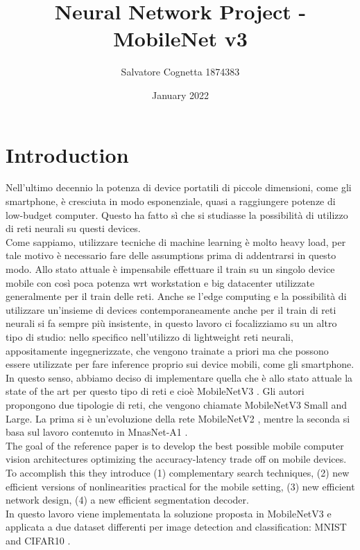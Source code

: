 \documentclass[12pt, letterpaper, twoside]{article}
\title{Neural Network Project - MobileNet v3}
\author{Salvatore Cognetta 1874383}
\date{January 2022}
\begin{document}
\begin{titlepage}
\maketitle
\end{titlepage}

\clearpage
\thispagestyle{empty}
\vspace*{\fill}
\vspace*{\fill}
\clearpage


\tableofcontents

\newpage
    
\newpage
\section{Introduction}
Nell'ultimo decennio la potenza di device portatili di piccole dimensioni, come gli smartphone, è cresciuta in modo esponenziale, quasi a raggiungere potenze di low-budget computer. Questo ha fatto sì che si studiasse la possibilità di utilizzo di reti neurali su questi devices. \\
Come sappiamo, utilizzare tecniche di machine learning è molto heavy load, per tale motivo è necessario fare delle assumptions prima di addentrarsi in questo modo. Allo stato attuale è impensabile effettuare il train su un singolo device mobile con così poca potenza wrt workstation e big datacenter utilizzate generalmente per il train delle reti. Anche se l'edge computing e la possibilità di utilizzare un'insieme di devices contemporaneamente anche per il train di reti neurali si fa sempre più insistente, in questo lavoro ci focalizziamo su un altro tipo di studio: nello specifico nell'utilizzo di lightweight reti neurali, appositamente ingegnerizzate, che vengono trainate a priori ma che possono essere utilizzate per fare inference proprio sui device mobili, come gli smartphone. \\
In questo senso, abbiamo deciso di implementare quella che è allo stato attuale la state of the art per questo tipo di reti e cioè MobileNetV3 \cite{howard2019searching}. Gli autori propongono due tipologie di reti, che vengono chiamate MobileNetV3 Small and Large. La prima si è un'evoluzione della rete MobileNetV2 \cite{sandler2019mobilenetv2}, mentre la seconda si basa sul lavoro contenuto in MnasNet-A1 \cite{tan2019mnasnet}. \\

The goal of the reference paper is to develop the best possible mobile computer vision architectures optimizing the accuracy-latency trade off on mobile devices. To accomplish this they introduce (1) complementary search techniques, (2) new efficient versions of nonlinearities practical for the mobile setting, (3) new efficient network design, (4) a new efficient segmentation decoder.\\
In questo lavoro viene implementata la soluzione proposta in MobileNetV3 e applicata a due dataset differenti per image detection and classification: MNIST \cite{deng2012mnist} and CIFAR10 \cite{Krizhevsky09learningmultiple}.
\end{document}
